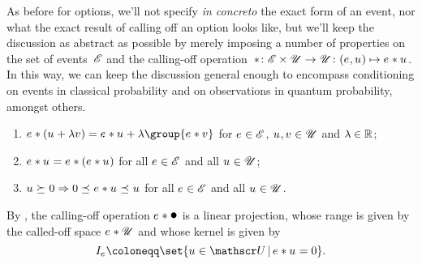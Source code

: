 \documentclass[preprint]{isipta2025}
\begin{document}
As before for options, we'll not specify {\itshape in concreto} the exact form of an event, nor what the exact result of calling off an option looks like, but we'll keep the discussion as abstract as possible by merely imposing a number of properties on the set of events~\(\mathscr{E}\) and the calling-off operation~\(\ast\colon\mathscr{E}\times\mathscr{U}\to\mathscr{U}\colon(e_{},u_{})\mapsto e_{}\ast u_{}\).
In this way, we can keep the discussion general enough to encompass conditioning on events in classical probability and on observations in quantum probability, amongst others.
\begin{enumerate}[label={\upshape E\arabic*.},ref={\upshape E\arabic*},series=events,widest=3,leftmargin=*,itemsep=0pt]
\item\label{axiom:event:linear} \(\calledoff{(\opt+\lambda\altopt)}=\calledoff{\opt}+\lambda\group{\calledoff{\altopt}}\) for \(e_{}\in\mathscr{E}\), \(u_{},v_{}\in\mathscr{U}\) and \(\lambda\in\mathbb{R}\);
\item\label{axiom:event:idempotent}\(e_{}\ast u_{}=e_{}\ast(e_{}\ast u_{})\) for all \(e_{}\in\mathscr{E}\) and all \(u_{}\in\mathscr{U}\);
\item\label{axiom:event:monotone} \(u_{}\mathrel{\succeq_{}}0\Rightarrow0\mathrel{\preceq_{}}e_{}\ast u_{}\mathrel{\preceq_{}}u_{}\) for all \(e_{}\in\mathscr{E}\) and all \(u_{}\in\mathscr{U}\).
\end{enumerate}
By , the calling-off operation \(\calledoff{\bolleke}\) is a linear projection, whose range is given by the called-off space \(e_{}\ast\mathscr{U}\) and whose kernel is given by
\begin{equation}\label{eq:indifset:event}
\eventindifset
\coloneqq\set{\opt\in\opts\given\calledoff{\opt}=0}.
\end{equation}
\end{document}
